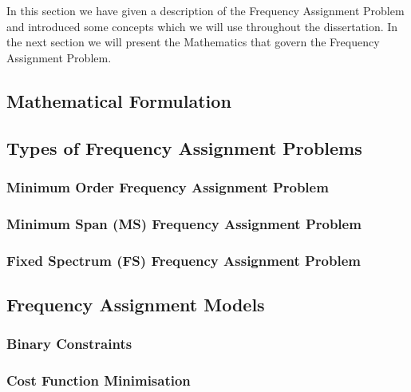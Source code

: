 In this section we have given a description of the Frequency Assignment Problem and introduced some concepts which we will use throughout the dissertation. In the next section we will present the 
Mathematics that govern the Frequency Assignment Problem.
\subsection{Mathematical Formulation}
\subsection{Types of Frequency Assignment Problems}
\subsubsection{Minimum Order Frequency Assignment Problem}
\subsubsection{Minimum Span (MS) Frequency Assignment Problem}
\subsubsection{Fixed Spectrum (FS) Frequency Assignment Problem}
\subsection{Frequency Assignment Models}
\subsubsection{Binary Constraints}
\subsubsection{Cost Function Minimisation}
